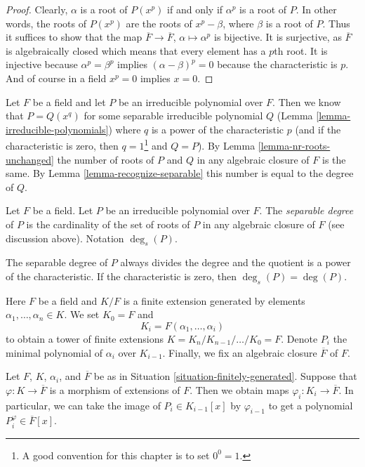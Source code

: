 \begin{proof}
Clearly, $\alpha$ is a root of $P(x^p)$ if and only if $\alpha^p$ is a
root of $P$. In other words, the roots of $P(x^p)$ are the roots of
$x^p - \beta$, where $\beta$ is a root of $P$. Thus it suffices to show
that the map $\overline{F} \to \overline{F}$, $\alpha \mapsto \alpha^p$
is bijective. It is surjective, as $\overline{F}$ is algebraically closed
which means that every element has a $p$th root. It is injective because
$\alpha^p = \beta^p$ implies $(\alpha - \beta)^p = 0$ because
the characteristic is $p$. And of course in a field $x^p = 0$ implies
$x = 0$.
\end{proof}

\noindent
Let $F$ be a field and let $P$ be an irreducible polynomial over $F$.
Then we know that $P = Q(x^q)$ for some separable irreducible polynomial $Q$
(Lemma \ref{lemma-irreducible-polynomials}) where $q$ is a power of
the characteristic $p$ (and if the characteristic is zero, then
$q = 1$\footnote{A good convention for this chapter is to set $0^0 = 1$.}
and $Q = P$). By Lemma \ref{lemma-nr-roots-unchanged} the number of
roots of $P$ and $Q$ in any algebraic closure of $F$ is the same.
By Lemma \ref{lemma-recognize-separable} this number is equal to the degree
of $Q$.

\begin{definition}
\label{definition-separable-degree}
Let $F$ be a field. Let $P$ be an irreducible polynomial over $F$.
The {\it separable degree} of $P$ is the cardinality of the
set of roots of $P$ in any algebraic closure of $F$ (see discussion
above). Notation $\deg_s(P)$.
\end{definition}

\noindent
The separable degree of $P$ always divides the degree and the quotient
is a power of the characteristic. If the characteristic is zero, then
$\deg_s(P) = \deg(P)$.

\begin{situation}
\label{situation-finitely-generated}
Here $F$ be a field and $K/F$ is a finite extension generated by elements
$\alpha_1, \ldots, \alpha_n \in K$. We set $K_0 = F$ and
$$
K_i = F(\alpha_1, \ldots, \alpha_i)
$$
to obtain a tower of finite extensions
$K = K_n / K_{n - 1} / \ldots / K_0 = F$.
Denote $P_i$ the minimal polynomial of $\alpha_i$ over $K_{i - 1}$.
Finally, we fix an algebraic closure $\overline{F}$ of $F$.
\end{situation}

\noindent
Let $F$, $K$, $\alpha_i$, and $\overline{F}$ be as in
Situation \ref{situation-finitely-generated}.
Suppose that $\varphi : K \to \overline{F}$ is a morphism of extensions
of $F$. Then we obtain maps $\varphi_i : K_i \to \overline{F}$.
In particular, we can take the image of $P_i \in K_{i - 1}[x]$ by
$\varphi_{i - 1}$ to get a polynomial $P_i^\varphi \in \overline{F}[x]$.

